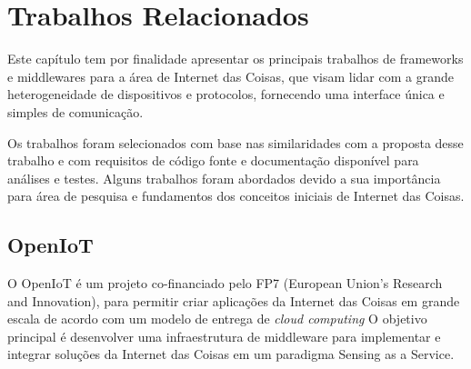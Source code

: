 
\chapter{Trabalhos Relacionados}

Este capítulo tem por finalidade apresentar os principais trabalhos
de frameworks e middlewares para a área de Internet das Coisas, que
visam lidar com a grande heterogeneidade de dispositivos e protocolos,
fornecendo uma interface única e simples de comunicação.

Os trabalhos foram selecionados com base nas similaridades com a proposta
desse trabalho e com requisitos de código fonte e documentação disponível
para análises e testes. Alguns trabalhos foram abordados devido a
sua importância para área de pesquisa e fundamentos dos conceitos
iniciais de Internet das Coisas.

\section{OpenIoT}

O OpenIoT é um projeto co-financiado pelo FP7 (European Union's Research
and Innovation), para permitir \textquotedbl{}criar aplicações da
Internet das Coisas em grande escala de acordo com um modelo de entrega
de \emph{cloud computing}\textquotedbl{}\cite{kim2014openiot} O objetivo
principal é desenvolver uma infraestrutura de middleware para implementar
e integrar soluções da Internet das Coisas em um paradigma \textquotedbl{}Sensing
as a Service\textquotedbl{}. 

